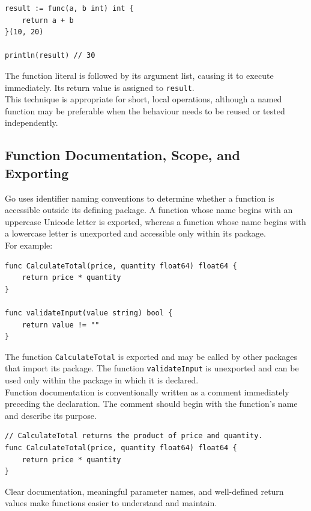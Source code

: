 \begin{lstlisting}
result := func(a, b int) int {
    return a + b
}(10, 20)

println(result) // 30
\end{lstlisting}

The function literal is followed by its argument list, causing it to execute immediately. Its return value is assigned to \texttt{result}.\\

This technique is appropriate for short, local operations, although a named function may be preferable when the behaviour needs to be reused or tested independently.

\subsection{Function Documentation, Scope, and Exporting}

Go uses identifier naming conventions to determine whether a function is accessible outside its defining package. A function whose name begins with an uppercase Unicode letter is exported, whereas a function whose name begins with a lowercase letter is unexported and accessible only within its package.\\

For example:

\begin{lstlisting}
func CalculateTotal(price, quantity float64) float64 {
    return price * quantity
}

func validateInput(value string) bool {
    return value != ""
}
\end{lstlisting}

The function \texttt{CalculateTotal} is exported and may be called by other packages that import its package. The function \texttt{validateInput} is unexported and can be used only within the package in which it is declared.\\

Function documentation is conventionally written as a comment immediately preceding the declaration. The comment should begin with the function's name and describe its purpose.

\begin{lstlisting}
// CalculateTotal returns the product of price and quantity.
func CalculateTotal(price, quantity float64) float64 {
    return price * quantity
}
\end{lstlisting}

Clear documentation, meaningful parameter names, and well-defined return values make functions easier to understand and maintain.

